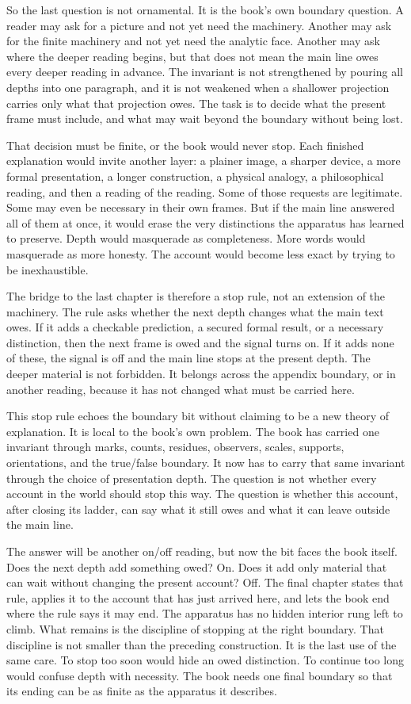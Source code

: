 So the last question is not ornamental. It is the book's own boundary question. A reader may ask
for a picture and not yet need the machinery. Another may ask for the finite machinery and not
yet need the analytic face. Another may ask where the deeper reading begins, but that does not
mean the main line owes every deeper reading in advance. The invariant is not strengthened by
pouring all depths into one paragraph, and it is not weakened when a shallower projection carries
only what that projection owes. The task is to decide what the present frame must include, and
what may wait beyond the boundary without being lost.

That decision must be finite, or the book would never stop. Each finished explanation would
invite another layer: a plainer image, a sharper device, a more formal presentation, a longer
construction, a physical analogy, a philosophical reading, and then a reading of the reading.
Some of those requests are legitimate. Some may even be necessary in their own frames. But if
the main line answered all of them at once, it would erase the very distinctions the apparatus
has learned to preserve. Depth would masquerade as completeness. More words would masquerade as
more honesty. The account would become less exact by trying to be inexhaustible.

The bridge to the last chapter is therefore a stop rule, not an extension of the machinery. The
rule asks whether the next depth changes what the main text owes. If it adds a checkable
prediction, a secured formal result, or a necessary distinction, then the next frame is owed and
the signal turns on. If it adds none of these, the signal is off and the main line stops at the
present depth. The deeper material is not forbidden. It belongs across the appendix boundary, or
in another reading, because it has not changed what must be carried here.

This stop rule echoes the boundary bit without claiming to be a new theory of explanation. It is
local to the book's own problem. The book has carried one invariant through marks, counts,
residues, observers, scales, supports, orientations, and the true/false boundary. It now has to
carry that same invariant through the choice of presentation depth. The question is not whether
every account in the world should stop this way. The question is whether this account, after
closing its ladder, can say what it still owes and what it can leave outside the main line.

The answer will be another on/off reading, but now the bit faces the book itself. Does the next
depth add something owed? On. Does it add only material that can wait without changing the
present account? Off. The final chapter states that rule, applies it to the account that has just
arrived here, and lets the book end where the rule says it may end. The apparatus has no hidden
interior rung left to climb. What remains is the discipline of stopping at the right boundary.
That discipline is not smaller than the preceding construction. It is the last use of the same
care. To stop too soon would hide an owed distinction. To continue too long would confuse depth
with necessity. The book needs one final boundary so that its ending can be as finite as the
apparatus it describes.

